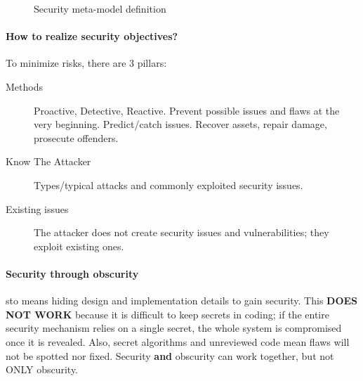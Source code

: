 \begin{figure}[!htbp]
    \caption{Security meta-model definition}
    \label{fig:sec-meta-model}
\end{figure}

\paragraph{How to realize security objectives?}
To minimize risks, there are 3 pillars:
\begin{description}
    \item[Methods] Proactive, Detective, Reactive.
    \subitem[Proactive] Prevent possible issues and flaws at the very beginning.
    \subitem[Detective] Predict/catch issues.
    \subitem[Reactive] Recover assets, repair damage, prosecute offenders.
    \item[Know The Attacker] Types/typical attacks and commonly exploited security issues.
    \item[Existing issues] The attacker does not create security issues and vulnerabilities; they exploit existing ones. 
\end{description}

\paragraph{Security through obscurity} 
\gls{sto} means hiding design and implementation details to gain security. This \textbf{DOES NOT WORK} because it is difficult to keep secrets in coding; if the entire security mechanism relies on a single secret, the whole system is compromised once it is revealed. Also, secret algorithms and unreviewed code mean flaws will not be spotted nor fixed. Security \textbf{and} obscurity can work together, but not ONLY obscurity.

